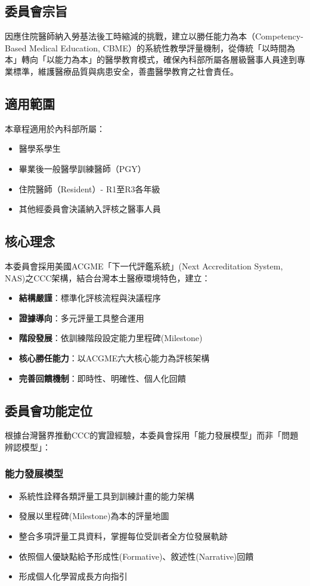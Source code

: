\documentclass[12pt,a4paper]{article}
\begin{document}
\subsection{委員會宗旨}
因應住院醫師納入勞基法後工時縮減的挑戰，建立以勝任能力為本（Competency-Based Medical Education, CBME）的系統性教學評量機制，從傳統「以時間為本」轉向「以能力為本」的醫學教育模式，確保內科部所屬各層級醫事人員達到專業標準，維護醫療品質與病患安全，善盡醫學教育之社會責任。
\subsection{適用範圍}
本章程適用於內科部所屬：
\begin{itemize}[nosep]
    \item 醫學系學生
    \item 畢業後一般醫學訓練醫師（PGY）
    \item 住院醫師（Resident）- R1至R3各年級
    \item 其他經委員會決議納入評核之醫事人員
\end{itemize}
\subsection{核心理念}
本委員會採用美國ACGME「下一代評鑑系統」(Next Accreditation System, NAS)之CCC架構，結合台灣本土醫療環境特色，建立：
\begin{itemize}[nosep]
    \item \textbf{結構嚴謹}：標準化評核流程與決議程序
    \item \textbf{證據導向}：多元評量工具整合運用
    \item \textbf{階段發展}：依訓練階段設定能力里程碑(Milestone)
    \item \textbf{核心勝任能力}：以ACGME六大核心能力為評核架構
    \item \textbf{完善回饋機制}：即時性、明確性、個人化回饋
\end{itemize}
\subsection{委員會功能定位}
根據台灣醫界推動CCC的實證經驗，本委員會採用「能力發展模型」而非「問題辨認模型」：
\subsubsection{能力發展模型}
\begin{itemize}[nosep]
    \item 系統性詮釋各類評量工具到訓練計畫的能力架構
    \item 發展以里程碑(Milestone)為本的評量地圖
    \item 整合多項評量工具資料，掌握每位受訓者全方位發展軌跡
    \item 依照個人優缺點給予形成性(Formative)、敘述性(Narrative)回饋
    \item 形成個人化學習成長方向指引
\end{itemize}
\end{document}
